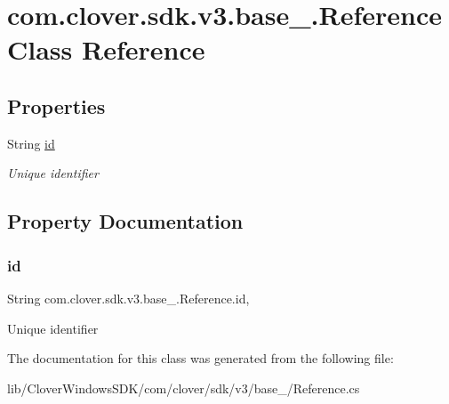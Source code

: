 \hypertarget{classcom_1_1clover_1_1sdk_1_1v3_1_1base___1_1_reference}{}\section{com.\+clover.\+sdk.\+v3.\+base\+\_\+.\+Reference Class Reference}
\label{classcom_1_1clover_1_1sdk_1_1v3_1_1base___1_1_reference}
\subsection*{Properties}
\begin{DoxyCompactItemize}
\item 
String \hyperlink{classcom_1_1clover_1_1sdk_1_1v3_1_1base___1_1_reference_a93d5319a2ba8b0c38fcfcd8b8be3d7a0}{id}
\begin{DoxyCompactList}\small\item\em Unique identifier \end{DoxyCompactList}\end{DoxyCompactItemize}


\subsection{Property Documentation}
\mbox{\label{classcom_1_1clover_1_1sdk_1_1v3_1_1base___1_1_reference_a93d5319a2ba8b0c38fcfcd8b8be3d7a0}} 
\subsubsection{\texorpdfstring{id}{id}}
{\footnotesize\ttfamily String com.\+clover.\+sdk.\+v3.\+base\+\_\+.\+Reference.\+id\hspace{0.3cm}{\ttfamily [get]}, {\ttfamily [set]}}



Unique identifier 



The documentation for this class was generated from the following file\+:\begin{DoxyCompactItemize}
\item 
lib/\+Clover\+Windows\+S\+D\+K/com/clover/sdk/v3/base\+\_\+/Reference.\+cs\end{DoxyCompactItemize}
